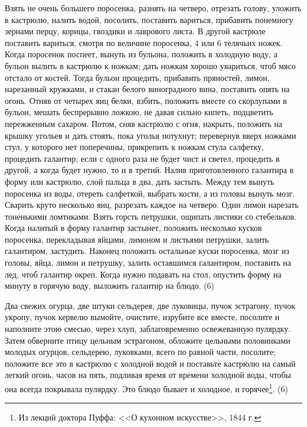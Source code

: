 Взять не очень большего поросенка, разнять на четверо, отрезать голову, уложить в кастрюлю, налить водой, посолить, поставить вариться, прибавить понемногу зернами перцу, корицы, гвоздики и лаврового листа. В другой кастрюле поставить вариться, смотря по величине поросенка, 4 или 6 телячьих ножек. Когда поросенок поспеет, вынуть из бульона, положить в холодную воду, а бульон вылить в кастрюлю к ножкам; дать ножкам хорошо увариться, чтоб мясо отстало от костей. Тогда бульон процедить, прибавить пряностей, лимон, нарезанный кружками, и стакан белого виноградного вина, поставить опять на огонь. Отняв от четырех яиц белки, взбить, положить вместе со скорлупами в бульон, мешать беспрерывно ложкою, не давая сильно кипеть, подцветить пережженным сахаром. Потом, сняв кастрюлю с огня, накрыть, положить на крышку угольев и дать стоять, пока уголья потухнут; перевернув вверх ножками стул, у которого нет поперечины, прикрепить к ножкам стула салфетку, процедить галантир; если с одного раза не будет чист и светел, процедить в другой, а когда будет нужно, то и в третий. Налив приготовленного галантира в форму или кастрюлю, слой пальца в два, дать застыть. Между тем вынуть поросенка из воды, отереть салфеткой, выбрать кости, а из головы вынуть мозг. Сварить круто несколько яиц, разрезать каждое на четверо. Один лимон нарезать тоненькими ломтиками. Взять горсть петрушки, ощипать листики со стебельков. Когда налитый в форму галантир застынет, положить несколько кусков поросенка, перекладывая яйцами, лимоном и листьями петрушки, залить галантиром, застудить. Наконец положить остальные куски поросенка, мозг из головы, яйца, лимон и петрушку, залить оставшимся галантиром, поставить на лед, чтоб галантир окреп. Когда нужно подавать на стол, опустить форму на минуту в горячую воду, выложить галантир на блюдо. (6)


Два свежих огурца, две штуки сельдерея, две луковицы, пучок эстрагону, пучок укропу, пучок кервелю вымойте, очистите, изрубите все вместе, посолите и наполните этою смесью, через хлуп, заблаговременно освежеванную пулярдку. Затем обверните птицу цельным эстрагоном, обложите цельными половинками молодых огурцов, сельдерею, луковками, всего по равной части, посолите; положите все это в кастрюлю с холодной водой и поставьте кастрюлю на самый легкий огонь, часов на пять, подливая время от времени холодной воды, чтобы она всегда покрывала пулярдку. Это блюдо бывает и холодное, и горячее\footnote{Из лекций доктора Пуффа: <<О кухонном искусстве>>, 1844 г.}. (6)

